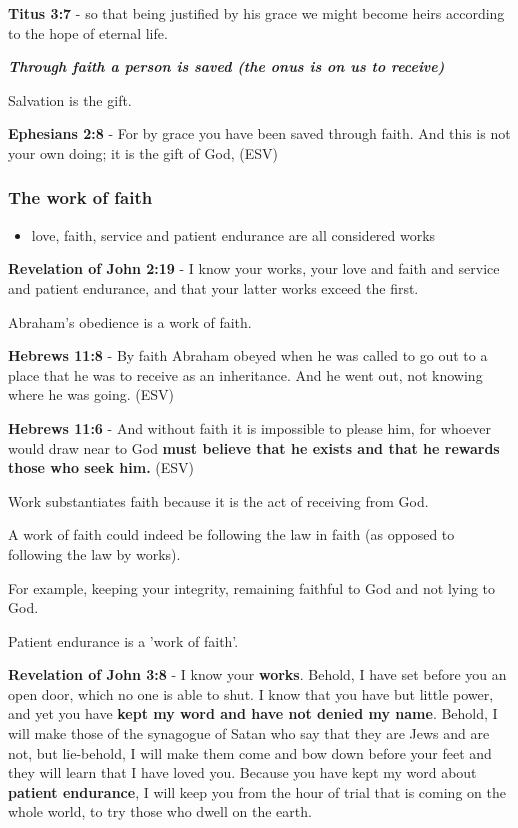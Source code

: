 \documentclass[11pt]{article}
\begin{document}
\textbf{Titus 3:7} - so that being justified by his grace we might become heirs according to the hope of eternal life.

\emph{\textbf{Through faith a person is saved (the onus is on us to receive)}}

Salvation is the gift.

\textbf{Ephesians 2:8} - For by grace you have been saved through faith. And this is not your own doing; it is the gift of God, (ESV)

\subsubsection{The work of faith}
\label{sec:org8ef5665}
\begin{itemize}
\item love, faith, service and patient endurance are all considered works
\end{itemize}

\textbf{Revelation of John 2:19} - I know your works, your love and faith and service and patient endurance, and that your latter works exceed the first.

Abraham's obedience is a work of faith.

\textbf{Hebrews 11:8} - By faith Abraham obeyed when he was called to go out to a place that he was to receive as an inheritance. And he went out, not knowing where he was going. (ESV)

\textbf{Hebrews 11:6} - And without faith it is impossible to please him, for whoever would draw near to God \textbf{must believe that he exists and that he rewards those who seek him.} (ESV)

Work substantiates faith because it is the act of receiving from God.

A work of faith could indeed be following the law in faith (as opposed to following the law by works).

For example, keeping your integrity, remaining faithful to God and not lying to God.

Patient endurance is a 'work of faith'.

\textbf{Revelation of John 3:8} - I know your \textbf{works}. Behold, I have set before you an open door, which no one is able to shut. I know that you have but little power, and yet you have \textbf{kept my word and have not denied my name}. Behold, I will make those of the synagogue of Satan who say that they are Jews and are not, but lie-behold, I will make them come and bow down before your feet and they will learn that I have loved you. Because you have kept my word about \textbf{patient endurance}, I will keep you from the hour of trial that is coming on the whole world, to try those who dwell on the earth.
\end{document}
